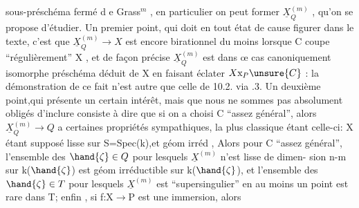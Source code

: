 
sous-préschéma fermé d e Grass$^{m}$ , en particulier on peut former $\underline{X}^{(m)}_{Q}$ ,
qu'on se propose d'étudier. Un premier point, qui doit en tout état de
cause figurer dans le texte, c'est que $\underline{X}^{(m)}_{Q} \longrightarrow X$ est encore birationnel
du moins lorsque C coupe ``régulièrement'' X , et de façon précise $\underline{X}^{(m)}_{Q}$
est dans œ cas canoniquement isomorphe  préschéma déduit de X en
faisant éclater $X\mathrm{x}_{P}\unsure{C}$ : la démonstration de ce fait n'est autre que celle
de 10.2. via .3. Un deuxième point,qui présente un certain intérêt,
mais que nous ne sommes pas absolument obligés d'inclure consiste à
dire que si on a choisi C ``assez général'', alors $\underline{X}^{(m)}_{Q} \longrightarrow Q$ a certaines
propriétés sympathiques, la plus classique étant celle-ci: X étant
supposé lisse sur S=Spec(k),et  géom irréd , Alors pour C ``assez
général'', l'ensemble des $\hand{\zeta}\in Q$ pour lesquels $\underline{X}^{(m)}$ n'est lisse de dimen-%
sion n-m sur k($\hand{\zeta}$) est géom irréductible sur k($\hand{\zeta}$), et 
l'ensemble des $\hand{\zeta}\in T$ pour lesquels $\underline{X}^{(m)}$ est ``supersingulier'' en au
moins un point est rare dans T;
 enfin , si f:X$\rightarrow$P est une immersion, alors

